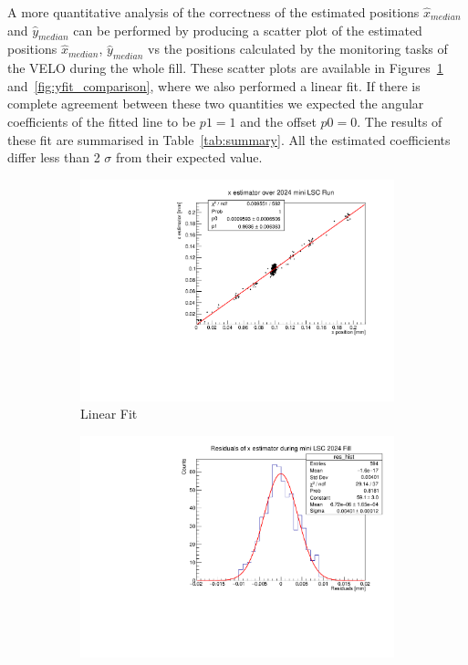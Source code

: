 A more quantitative analysis of the correctness of the estimated positions $\hat{x}_{median}$ and $\hat{y}_{median}$ can be performed by producing a scatter plot of the estimated positions $\hat{x}_{median}$, $\hat{y}_{median}$ vs the positions calculated by the monitoring tasks of the VELO during the whole fill. These scatter plots are available in Figures~\ref{fig:xfit_comparison} and~\ref{fig:yfit_comparison}, where we also performed a linear fit. If there is complete agreement between these two quantities we expected the angular coefficients of the fitted line to be $p1=1$ and the offset $p0=0$. 
The results of these fit are summarised in Table~\ref{tab:summary}. All the estimated coefficients differ less than 2 $\sigma$ from their expected value. 


\begin{figure}
    \centering
    \begin{subfigure}{0.48\textwidth}
    \includegraphics[width=\linewidth]{figures/x_comparison_side.pdf}
    \caption{Linear Fit}\label{fig:xfit_comparison}
    \end{subfigure}
    \begin{subfigure}{0.48\textwidth}
    \includegraphics[width=\linewidth]{figures/x_comparison_res_side.pdf}

\end{subfigure}
\end{figure}
